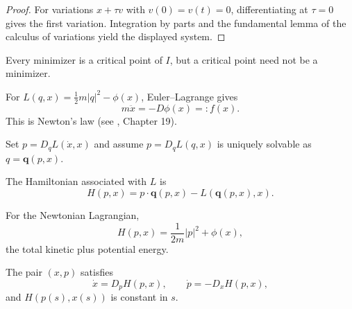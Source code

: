 \begin{proof}
\sketch For variations $x+\tau v$ with $v(0)=v(t)=0$, differentiating at
$\tau=0$ gives the first variation. Integration by parts and the fundamental
lemma of the calculus of variations yield the displayed system.
\end{proof}

\begin{remark}
\label{rem:critical-point-vs-minimizer}
Every minimizer is a critical point of $I$, but a critical point need not be a
minimizer.
\end{remark}

\begin{example}
\label{ex:newtons-law-lagrangian}
For $L(q,x)=\frac12m|q|^2-\phi(x)$, Euler--Lagrange gives
\[
m\ddot x=-D\phi(x)=:f(x).
\]
This is Newton's law (see \cite{FeynmanLeightonSands1966}, Chapter 19).
\end{example}

Set $p=D_qL(\dot x,x)$ and assume $p=D_qL(q,x)$ is uniquely solvable as
$q=\mathbf q(p,x)$.

\begin{definition}
\label{def:hamiltonian-from-lagrangian}
The Hamiltonian associated with $L$ is
\[
H(p,x)=p\cdot\mathbf q(p,x)-L(\mathbf q(p,x),x).
\]
\end{definition}

\begin{example}
\label{ex:hamiltonian-newtons-law}
For the Newtonian Lagrangian,
\[
H(p,x)=\frac1{2m}|p|^2+\phi(x),
\]
the total kinetic plus potential energy.
\end{example}

\begin{theorem}
\label{thm:hamiltons-ode-derivation}
The pair $(x,p)$ satisfies
\[
\dot x=D_pH(p,x),\qquad \dot p=-D_xH(p,x),
\]
and $H(p(s),x(s))$ is constant in $s$.
\end{theorem}

